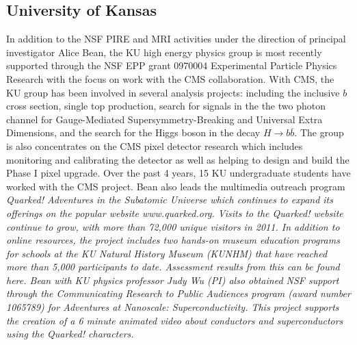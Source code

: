 
\subsection{University of Kansas}

In addition to the NSF PIRE and MRI activities under the direction of
principal investigator Alice Bean, the KU high energy physics group is
most recently supported through the NSF EPP grant 0970004
Experimental Particle Physics Research with the focus on work with the
CMS collaboration.  With CMS, the KU group has been involved in
several analysis projects: including the inclusive $b$ cross
section\cite{bcross}, single top production\cite{singletop}, search
for signals in the the two photon channel for Gauge-Mediated
Supersymmetry-Breaking and Universal Extra Dimensions\cite{dmsearch},
and the search for the Higgs boson in the decay $H\rightarrow
b\overline{b}$\cite{higgsbb}.  The group is also concentrates on the
CMS pixel detector research which includes monitoring and calibrating
the detector as well as helping to design and build the Phase I pixel
upgrade.  Over the past 4 years, 15 KU undergraduate students have
worked with the CMS project.  Bean also leads the multimedia outreach
program \it{Quarked!  Adventures in the Subatomic Universe} which
continues to expand its offerings on the popular website
www.quarked.org.  Visits to the Quarked! website continue to grow,
with more than 72,000 unique visitors in 2011. In addition to online
resources, the project includes two hands-on museum education programs
for schools at the KU Natural History Museum (KUNHM) that have reached
more than 5,000 participants to date.  Assessment results from this
can be found here\cite{quarked}.  Bean with KU physics professor Judy
Wu (PI) also obtained NSF support through the Communicating Research
to Public Audiences program (award number 1065789) for \it{Adventures
  at Nanoscale: Superconductivity}. This project supports the creation
of a 6 minute animated video about conductors and superconductors
using the Quarked! characters.



